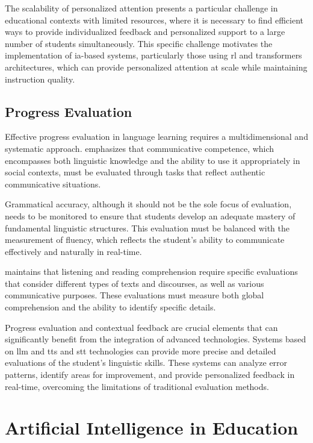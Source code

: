 The scalability of personalized attention presents a particular challenge in educational contexts with limited resources, where it is necessary to find efficient ways to provide individualized feedback and personalized support to a large number of students simultaneously. This specific challenge motivates the implementation of \gls{ia}-based systems, particularly those using \gls{rl} and \gls{transformers} architectures, which can provide personalized attention at scale while maintaining instruction quality.

\subsection{Progress Evaluation}

Effective progress evaluation in language learning requires a multidimensional and systematic approach. \cite{ellis1994study} emphasizes that communicative competence, which encompasses both linguistic knowledge and the ability to use it appropriately in social contexts, must be evaluated through tasks that reflect authentic communicative situations.

Grammatical accuracy, although it should not be the sole focus of evaluation, needs to be monitored to ensure that students develop an adequate mastery of fundamental linguistic structures. This evaluation must be balanced with the measurement of fluency, which reflects the student's ability to communicate effectively and naturally in real-time.

\cite{krashen1982principles} maintains that listening and reading comprehension require specific evaluations that consider different types of texts and discourses, as well as various communicative purposes. These evaluations must measure both global comprehension and the ability to identify specific details.

Progress evaluation and contextual feedback are crucial elements that can significantly benefit from the integration of advanced technologies. Systems based on \gls{llm} and \gls{tts} and \gls{stt} technologies can provide more precise and detailed evaluations of the student's linguistic skills. These systems can analyze error patterns, identify areas for improvement, and provide personalized feedback in real-time, overcoming the limitations of traditional evaluation methods.




\section{Artificial Intelligence in Education}

